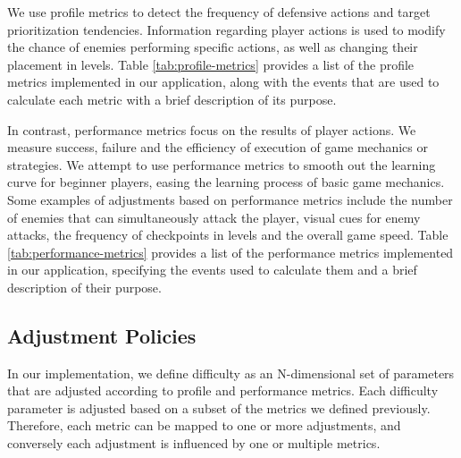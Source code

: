 We use profile metrics to detect the frequency of defensive actions and target prioritization tendencies. Information regarding player actions is used to modify the chance of enemies performing specific actions, as well as changing their placement in levels.  Table \ref{tab:profile-metrics} provides a list of the profile metrics implemented in our application, along with the events that are used to calculate each metric with a brief description of its purpose.




In contrast, performance metrics focus on the results of player actions. We measure success, failure and the efficiency of execution of game mechanics or strategies. We attempt to use performance metrics to smooth out the learning curve for beginner players, easing the learning process of basic game mechanics. Some examples of adjustments based on performance metrics include the number of enemies that can simultaneously attack the player, visual cues for enemy attacks, the frequency of checkpoints in levels and the overall game speed. Table \ref{tab:performance-metrics} provides a list of the performance metrics implemented in our application, specifying the events used to calculate them and a brief description of their purpose.




\subsection{Adjustment Policies}
\label{sec:adjustments}

In our implementation, we define difficulty as an N-dimensional set of parameters that are adjusted according to profile and performance metrics. Each difficulty parameter is adjusted based on a subset of the metrics we defined previously. Therefore, each metric can be mapped to one or more adjustments, and conversely each adjustment is influenced by one or multiple metrics.

